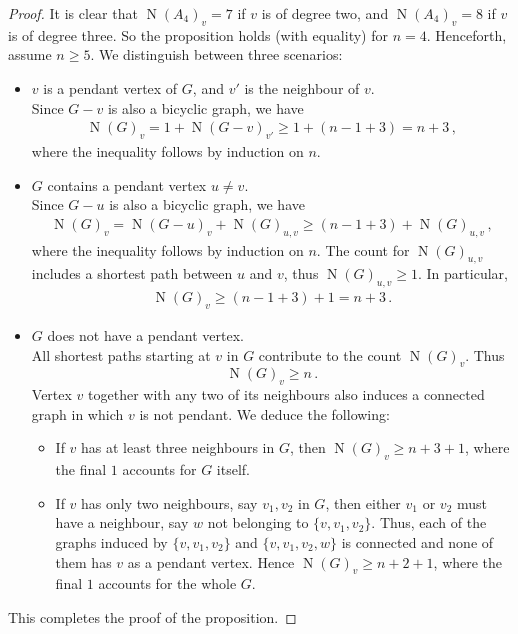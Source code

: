 \documentclass[10pt,a4paper]{amsart}
\DeclareMathOperator{\N}{N}
\begin{document}
\begin{proof}
It is clear that $\N(A_4)_v=7$ if $v$ is of degree two, and  $\N(A_4)_v=8$ if $v$ is of degree three. So the proposition holds (with equality) for $n=4$. Henceforth, assume $n\geq 5$. We distinguish between three scenarios:
\begin{itemize}
\item $v$ is a pendant vertex of $G$, and $v'$ is the neighbour of $v$.\\
Since $G-v$ is also a bicyclic graph, we have
\begin{align*}
\N(G)_v=1+\N(G-v)_{v'} \geq 1+ (n-1+3)=n+3\,,
\end{align*}
where the inequality follows by induction on $n$.
\item $G$ contains a pendant vertex $u \neq v$.\\
Since $G-u$ is also a bicyclic graph, we have
\begin{align*}
\N(G)_v=\N(G-u)_v + \N(G)_{u,v} \geq (n-1+3)  + \N(G)_{u,v} \,,
\end{align*}
where the inequality follows by induction on $n$. The count for $\N(G)_{u,v}$ includes a shortest path between $u$ and $v$, thus $\N(G)_{u,v} \geq 1$. In particular,
\begin{align*}
\N(G)_v \geq  (n-1+3)  + 1 = n+3\,.
\end{align*}
\item $G$ does not have a pendant vertex.\\
All shortest paths starting at $v$ in $G$ contribute to the count $\N(G)_v$. Thus
$$\N(G)_v \geq n\,.$$
Vertex $v$ together with any two of its neighbours also induces a connected graph in which $v$ is not pendant. We deduce the following:
\begin{itemize}
\item If $v$ has at least three neighbours in $G$, then $\N(G)_v \geq n +3 +1$, where the final $1$ accounts for $G$ itself.
\item If $v$ has only two neighbours, say $v_1,v_2$ in $G$, then either $v_1$ or $v_2$ must have a neighbour, say $w$ not belonging to $\{v,v_1,v_2\}$. Thus, each of the graphs induced by $\{v,v_1,v_2\}$ and $\{v,v_1,v_2,w\}$ is connected and none of them has $v$ as a pendant vertex. Hence  $\N(G)_v \geq n +2 +1$, where the final $1$ accounts for the whole $G$.
\end{itemize}
\end{itemize}
This completes the proof of the proposition.
\end{proof}
\end{document}

